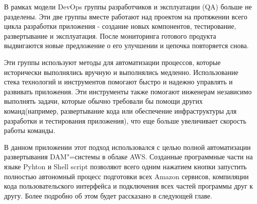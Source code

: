 В рамках модели DevOps группы разработчиков и эксплуатации (QA) больше не разделены. Эти две группы вместе работают над проектом на протяжении всего цикла разработки приложения - создание новых компонентов, тестирование, развертывание и эксплуатация. После мониторинга готового продукта выдвигаются новые предложение о его улучшении и цепочка повторяется снова.

Эти группы используют методы для автоматизации процессов, которые исторически выполнялись вручную и выполнялись медленно. Использование стека технологий и инструментов помогают быстро и надежно управлять и развивать приложения. Эти инструменты также помогают инженерам независимо выполнять задачи, которые обычно требовали бы помощи других команд(например, развертывание кода или обеспечение инфраструктуры для разработки и тестирования приложения), что еще больше увеличивает скорость работы команды.

В данном приложении этот подход использовался с целью полной автоматизации развертывания DAM"=системы в облаке AWS. Созданные программные части на языке Pyhton и Shell script позволяют всего одним нажатием кнопки запустить полностью автономный процесс подготовки всех Amazon сервисов, компиляции кода пользовательского интерфейса и подключения всех частей программы друг к другу. Более подробно об этом будет рассказано в следующей главе.

